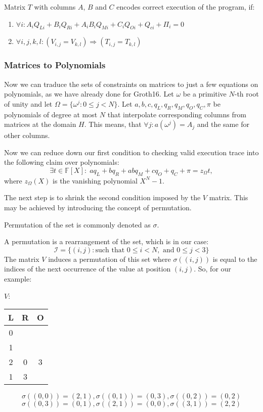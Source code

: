 \documentclass[../lecture-notes.tex]{subfiles}
\begin{document}
\begin{definition}
Matrix $T$ with columns $A$, $B$ and $C$ encodes correct execution of the program, if:
\begin{enumerate}
    \item \(\forall i: A_i Q_{Li} + B_i Q_{Ri} + A_i B_i Q_{Mi} + C_i Q_{Oi} + Q_{ci} + \Pi_i = 0\)
    \item \(\forall i, j, k, l: (V_{i,j} = V_{k,l}) \Rightarrow (T_{i,j} = T_{k,l})\)
\end{enumerate}
\end{definition}

\subsubsection{Matrices to Polynomials}

Now we can traduce the sets of constraints on matrices to just a few equations
on polynomials, as we have already done for Groth16. Let $\omega$ be a primitive
$N$-th root of unity and let $\Omega = \{\omega^j: 0 \le j < N\}$. Let \(a, b, c,
q_L, q_R, q_M, q_O, q_C, \pi\) be polynomials of degree at most $N$ that
interpolate corresponding columns from matrices at the domain $H$. This means,
that \(\forall j: a(\omega^j) = A_j\) and the same for other columns.

Now we can reduce down our first condition to checking valid execution trace
into the following claim over polynomials:
\[\exists t \in \mathbb{F}[X]: \; aq_L + bq_R + abq_M + cq_O + q_C + \pi = z_{\Omega} t,\]
where $z_{\Omega}(X)$ is the vanishing polynomial $X^N - 1$.

The next step is to shrink the second condition imposed by the $V$ matrix. This
may be achieved by introducing the concept of permutation. 

\begin{remark}
Permutation of the set is commonly denoted as $\sigma$.
\end{remark}

\begin{example}
A permutation is a rearrangement of the set, which is in our case: 
\[\mathcal{I} = \{(i, j) : \text{such that } 0 \leq i < N, \text{ and } 0 \leq j < 3\}\]
The matrix $V$ induces a permutation of this set where $\sigma((i,j))$ is equal to the indices of the next occurrence of the value at position $(i,j)$. So, for our example:

\begin{center}
\quad $V$:
\begin{tabular}{|c|c|c|}
\hline
L & R & O \\
\hline
0 &  &  \\
\hline
1 &  &  \\
\hline
2 & 0 & 3 \\
\hline
1 & 3 &  \\
\hline
\end{tabular}
\end{center}

\[\sigma((0,0)) = (2,1), \sigma((0,1)) = (0,3), \sigma((0,2)) = (0,2)\]
\[\sigma((0,3)) = (0,1), \sigma((2,1)) = (0,0), \sigma((3,1)) = (2,2)\]
\end{example}
\end{document}

